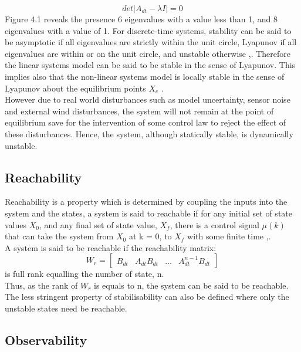 \documentclass[12pt,a4paper,twoside]{report}
\begin{document}
				\begin{equation}
					det|A_{dt} - \lambda I| = 0
				\end{equation}
				\space
				Figure 4.1 reveals the presence 6 eigenvalues with a value less than 1, and 8 eigenvalues with a value of 1. For discrete-time systems, stability can be said to be asymptotic if all eigenvalues are strictly within the unit circle, Lyapunov if all eigenvalues are within or on the unit circle, and unstable otherwise \cite{13},\cite{18}. Therefore the linear systems model can be said to be stable in the sense of Lyapunov. This implies also that the non-linear systems model is locally stable in the sense of Lyapunov about the equilibrium points $X_e$ \cite{13}.
				\\
				However due to real world disturbances such as model uncertainty, sensor noise and external wind disturbances, the system will not remain at the point of equilibrium save for the intervention of some control law to reject the effect of these disturbances. Hence, the system, although statically stable, is dynamically unstable.
				
			\subsection{Reachability}
				
				Reachability is a property which is determined by coupling the inputs into the system and the states, a system is said to reachable if for any initial set of state values $X_0$, and any final set of state value, $X_f$, there is a control signal $\mu(k)$ that can take the system from $X_0$ at k = 0, to  $X_f$ with some finite time \cite{18},\cite{25}.
				\\
				A system is said to be reachable if the reachability matrix:
				\begin{equation}
					W_r = 
					\begin{bmatrix}
						B_{dt} & A_{dt}B_{dt} & \dots & A_{dt}^{n-1}B_{dt}
					\end{bmatrix}
				\end{equation}
				is full rank equalling the number of state, n.
				\\
				Thus, as the rank of $W_r$ is equals to n, the system can be said to be reachable. 
				\\
				The less stringent property of stabilisability can also be defined where only the unstable states need be reachable.
				
			\subsection{Observability}
				
\end{document}
